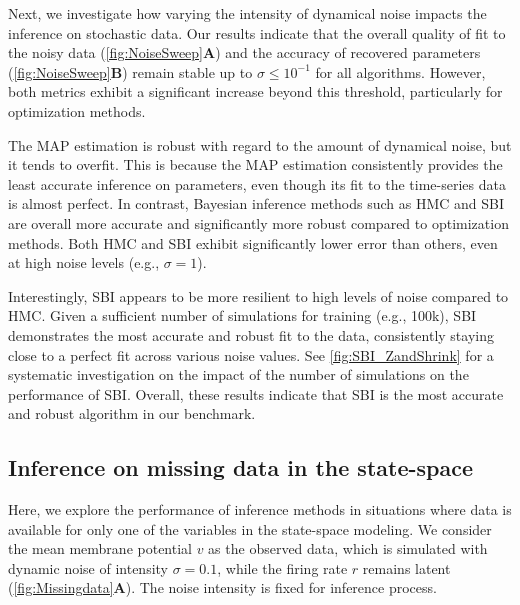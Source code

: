 \documentclass[preprint,11pt,authoryear]{elsarticle}
\begin{document}
Next, we investigate how varying the intensity of dynamical noise impacts the inference on stochastic data. Our results indicate that the overall quality of fit to the noisy data (\autoref{fig:NoiseSweep}\textbf{A}) and the accuracy of recovered parameters (\autoref{fig:NoiseSweep}\textbf{B}) remain stable up to $\sigma \leq 10^{-1}$ for all algorithms. However, both metrics exhibit a significant increase beyond this threshold, particularly for optimization methods. 

The MAP estimation is robust with regard to the amount of dynamical noise, but it tends to overfit. This is because the MAP estimation consistently provides the least accurate inference on parameters, even though its fit to the time-series data is almost perfect. In contrast, Bayesian inference methods such as HMC and SBI are overall more accurate and significantly more robust compared to optimization methods.  Both HMC and SBI exhibit significantly lower error than others, even at high noise levels (e.g., $\sigma = 1$). 

Interestingly, SBI appears to be more resilient to high levels of noise compared to HMC. Given a sufficient number of simulations for training (e.g., 100k), SBI demonstrates the most accurate and robust fit to the data, consistently staying close to a perfect fit across various noise values. See \autoref{fig:SBI_ZandShrink} for a systematic investigation on the impact of the number of simulations on the performance of SBI.  Overall, these results indicate that SBI is the most accurate and robust algorithm in our benchmark.


\subsection{Inference on missing data in the state-space}

Here, we explore the performance of inference methods in situations where data is available for only one of the variables in the state-space modeling. We consider the mean membrane potential $v$ as the observed data, which is simulated with dynamic noise of intensity $\sigma = 0.1$, while the firing rate $r$ remains latent (\autoref{fig:Missingdata}\textbf{A}). The noise intensity is fixed for inference process.
\end{document}
